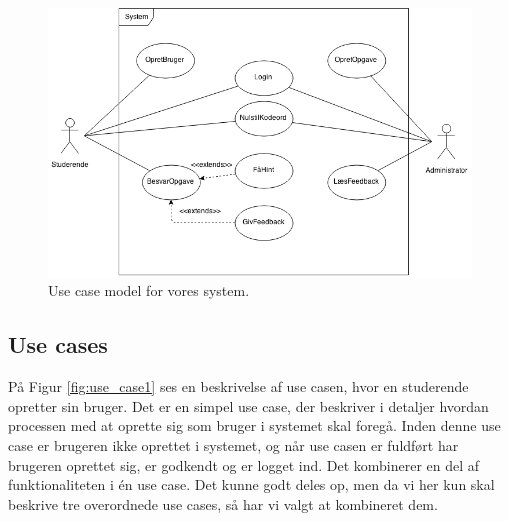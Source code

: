 \documentclass[11pt, a4paper]{article}
\begin{document}
\begin{figure}[h]
  \centering
  \includegraphics[width=1\linewidth]{figures/UseCaseModel.png}
  \caption{Use case model for vores system.}
  \label{fig:use_case_model}
\end{figure}
\FloatBarrier

\subsection{Use cases}
\label{sub:use_cases}
På Figur \ref{fig:use_case1} ses en beskrivelse af use casen, hvor en studerende opretter sin bruger. Det er en simpel use case, der beskriver i detaljer hvordan processen med at oprette sig som bruger i systemet skal foregå. Inden denne use case er brugeren ikke oprettet i systemet, og når use casen er fuldført har brugeren oprettet sig, er godkendt og er logget ind. Det kombinerer en del af funktionaliteten i én use case. Det kunne godt deles op, men da vi her kun skal beskrive tre overordnede use cases, så har vi valgt at kombineret dem.
\end{document}
